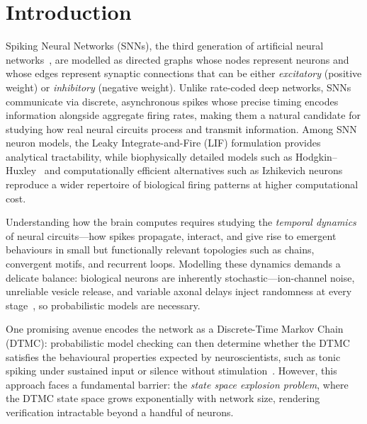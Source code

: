 \documentclass[runningheads]{llncs}
\begin{document}
\section{Introduction}\label{sec:intro}

Spiking Neural Networks (SNNs), the third generation of artificial neural
networks~\cite{maass1997networks}, are modelled as directed graphs whose nodes
represent neurons and whose edges represent synaptic connections that can be
either \emph{excitatory} (positive weight) or \emph{inhibitory} (negative
weight). Unlike rate-coded deep networks, SNNs communicate via discrete,
asynchronous spikes whose precise timing encodes information alongside aggregate
firing rates, making them a natural candidate for studying how real neural
circuits process and transmit information. Among SNN neuron models, the Leaky
Integrate-and-Fire (LIF) formulation provides analytical tractability, while
biophysically detailed models such as Hodgkin--Huxley~\cite{hodgkin1952quantitative}
and computationally efficient alternatives such as Izhikevich
neurons~\cite{izhikevich2003simple} reproduce a wider repertoire of biological
firing patterns at higher computational cost.

Understanding how the brain computes requires studying the \emph{temporal
dynamics} of neural circuits---how spikes propagate, interact, and give rise to
emergent behaviours in small but functionally relevant topologies such as
chains, convergent motifs, and recurrent loops. Modelling these dynamics demands
a delicate balance: biological neurons are inherently stochastic---ion-channel
noise, unreliable vesicle release, and variable axonal delays inject randomness
at every stage~\cite{hodgkin1952quantitative,nguyen2021review}, so probabilistic
models are necessary.

One promising avenue encodes the network as a Discrete-Time Markov Chain (DTMC):
probabilistic model checking can then determine whether the DTMC satisfies the
behavioural properties expected by neuroscientists, such as tonic spiking under
sustained input or silence without stimulation~\cite{naco20}. However, this
approach faces a fundamental barrier: the \emph{state space explosion problem},
where the DTMC state space grows exponentially with network size, rendering
verification intractable beyond a handful of neurons.
\end{document}
